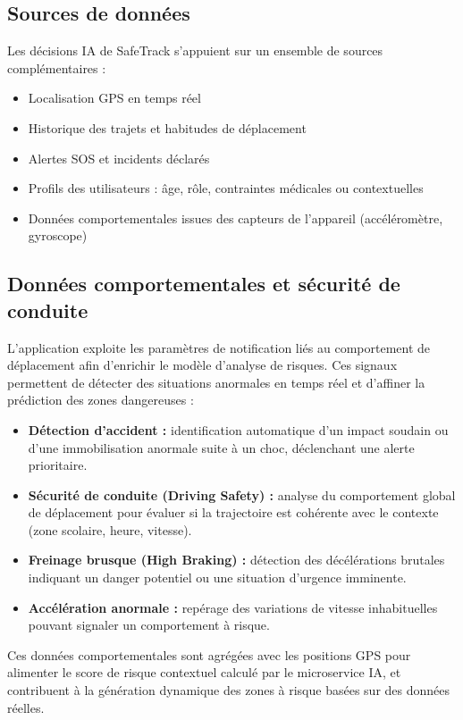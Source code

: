 \subsection{Sources de données}
Les décisions IA de SafeTrack s'appuient sur un ensemble de sources complémentaires :
\begin{itemize}
    \item Localisation GPS en temps réel
    \item Historique des trajets et habitudes de déplacement
    \item Alertes SOS et incidents déclarés
    \item Profils des utilisateurs : âge, rôle, contraintes médicales ou contextuelles
    \item Données comportementales issues des capteurs de l'appareil (accéléromètre, gyroscope)
\end{itemize}

\subsection{Données comportementales et sécurité de conduite}

L'application exploite les paramètres de notification liés au comportement de déplacement afin d'enrichir le modèle d'analyse de risques. Ces signaux permettent de détecter des situations anormales en temps réel et d'affiner la prédiction des zones dangereuses :

\begin{itemize}
    \item \textbf{Détection d'accident :} identification automatique d'un impact soudain ou d'une immobilisation anormale suite à un choc, déclenchant une alerte prioritaire.
    \item \textbf{Sécurité de conduite (Driving Safety) :} analyse du comportement global de déplacement pour évaluer si la trajectoire est cohérente avec le contexte (zone scolaire, heure, vitesse).
    \item \textbf{Freinage brusque (High Braking) :} détection des décélérations brutales indiquant un danger potentiel ou une situation d'urgence imminente.
    \item \textbf{Accélération anormale :} repérage des variations de vitesse inhabituelles pouvant signaler un comportement à risque.
\end{itemize}

Ces données comportementales sont agrégées avec les positions GPS pour alimenter le score de risque contextuel calculé par le microservice IA, et contribuent à la génération dynamique des zones à risque basées sur des données réelles.

